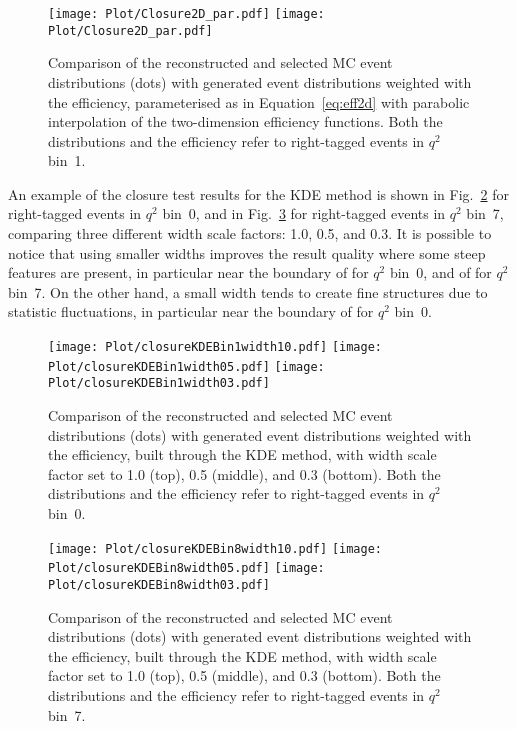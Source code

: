 \begin{figure}[hbt]
    \texttt{[image: Plot/Closure2D\_par.pdf]}
    \texttt{[image: Plot/Closure2D\_par.pdf]}
    \caption{Comparison of the reconstructed and selected MC event distributions (dots) with generated event distributions weighted with the efficiency, parameterised as in Equation~\ref{eq:eff2d} with parabolic interpolation of the two-dimension efficiency functions. Both the distributions and the efficiency refer to right-tagged events in $q^2$ bin~1.}
    \label{fig:clEff2Dpar}
\end{figure}

An example of the closure test results for the KDE method is shown in Fig.~\ref{fig:clKDEwidthBin1} for right-tagged events in $q^2$ bin~0, and in Fig.~\ref{fig:clKDEwidthBin8} for right-tagged events in $q^2$ bin~7, comparing three different width scale factors: 1.0, 0.5, and 0.3.
It is possible to notice that using smaller widths improves the result quality where some steep features are present, in particular near the boundary of \cTK for $q^2$ bin~0, and of \PHI for $q^2$ bin~7.
On the other hand, a small width tends to create fine structures due to statistic fluctuations, in particular near the boundary of \PHI for $q^2$ bin~0.

\begin{figure}[hbt]
    \texttt{[image: Plot/closureKDEBin1width10.pdf]}
    \texttt{[image: Plot/closureKDEBin1width05.pdf]}
    \texttt{[image: Plot/closureKDEBin1width03.pdf]}
    \caption{Comparison of the reconstructed and selected MC event distributions (dots) with generated event distributions weighted with the efficiency, built through the KDE method, with width scale factor set to 1.0 (top), 0.5 (middle), and 0.3 (bottom). Both the distributions and the efficiency refer to right-tagged events in $q^2$ bin~0.}
    \label{fig:clKDEwidthBin1}
\end{figure}

\begin{figure}[hbt]
    \texttt{[image: Plot/closureKDEBin8width10.pdf]}
    \texttt{[image: Plot/closureKDEBin8width05.pdf]}
    \texttt{[image: Plot/closureKDEBin8width03.pdf]}
    \caption{Comparison of the reconstructed and selected MC event distributions (dots) with generated event distributions weighted with the efficiency, built through the KDE method, with width scale factor set to 1.0 (top), 0.5 (middle), and 0.3 (bottom). Both the distributions and the efficiency refer to right-tagged events in $q^2$ bin~7.}
    \label{fig:clKDEwidthBin8}
\end{figure}

